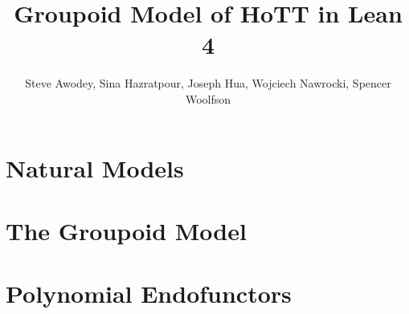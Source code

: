
\title{Groupoid Model of HoTT in Lean 4}
\author{Steve Awodey, Sina Hazratpour, Joseph Hua,
  Wojciech Nawrocki, Spencer Woolfson}


\maketitle

\section{Natural Models}

\section{The Groupoid Model}

\section{Polynomial Endofunctors}


{}



